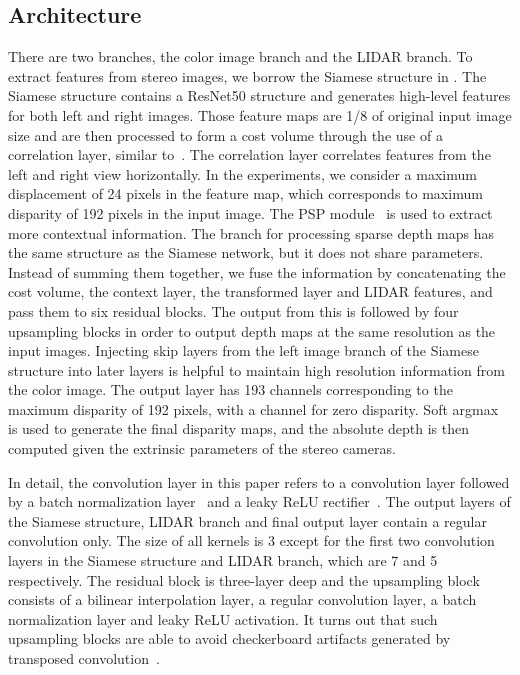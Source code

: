 \documentclass[letterpaper, 10 pt, conference]{ieeeconf}
\begin{document}
\subsection{Architecture}
    There are two branches, the color image branch and the LIDAR branch. To extract features from stereo images, we borrow the Siamese structure in \cite{dissegnet}. The Siamese structure contains a ResNet50 structure \cite{resnet} and generates high-level features for both left and right images. Those feature maps are 1/8 of original input image size and are then processed to form a cost volume through the use of a correlation layer, similar to~\cite{mayer2016large}. The correlation layer correlates features from the left and right view horizontally. In the experiments, we consider a maximum displacement of 24 pixels in the feature map, which corresponds to maximum disparity of 192 pixels in the input image. The PSP module~\cite{zhao2017pyramid} is used to extract more contextual information. The branch for processing sparse depth maps has the same structure as the Siamese network, but it does not share parameters. Instead of summing them together, we fuse the information by concatenating the cost volume, the context layer, the transformed layer and LIDAR features, and pass them to six residual blocks. The output from this is followed by four upsampling blocks in order to output depth maps at the same resolution as the input images. Injecting skip layers from the left image branch of the Siamese structure into later layers is helpful to maintain high resolution information from the color image. The output layer has 193 channels corresponding to the maximum disparity of 192 pixels, with a channel for zero disparity. Soft argmax~\cite{kendall} is used to generate the final disparity maps, and the absolute depth is then computed given the extrinsic parameters of the stereo cameras.

    In detail, the convolution layer in this paper refers to a convolution layer followed by a batch normalization layer~\cite{batchnorm} and a leaky ReLU rectifier~\cite{xu2015empirical}. The output layers of the Siamese structure, LIDAR branch and final output layer contain a regular convolution only. The size of all kernels is 3 except for the first two convolution layers in the Siamese structure and LIDAR branch, which are 7 and 5 respectively. The residual block is three-layer deep and the upsampling block consists of a bilinear interpolation layer, a regular convolution layer, a batch normalization layer and leaky ReLU activation. It turns out that such upsampling blocks are able to avoid checkerboard artifacts generated by transposed convolution~\cite{checkerboardArtifacts}. 
\end{document}
